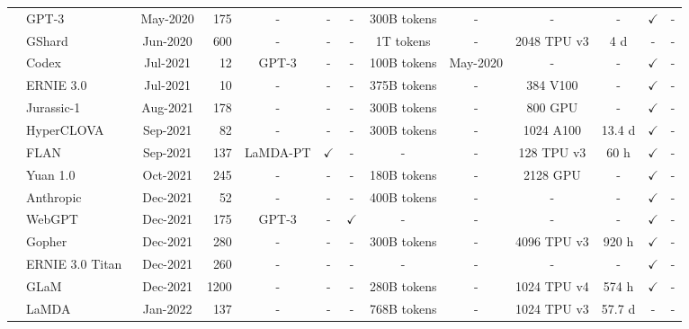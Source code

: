 \begin{table}[htbp]
\begin{tabular}{llcrccccccccc}
\midrule
\midrule
  & GPT-3~\cite{Brown-NeurIPS-2020-Language}    & May-2020    & 175   & -   & - & - & {300B tokens} & -  & -   & -  & $\checkmark$ & -       \\
  & GShard~\cite{Lepikhin-ILR-2021-GShard}   & Jun-2020    & 600   & -   & - & - & 1T tokens & -  & 2048 TPU v3 & 4 d & -    & -       \\
  & Codex~\cite{Chen-arxiv-2021-evaluating}    & Jul-2021    & 12    & GPT-3   & - & - & 100B tokens & May-2020 & -   & -  & $\checkmark$    & - \\
  & ERNIE 3.0~\cite{Sun-arXiv-2021-ERNIE3.0}    & Jul-2021    & 10    & -   & - & - & 375B tokens & - & 384 V100   & -  & $\checkmark$ & -    \\
  & Jurassic-1~\cite{lieber-2021-jurassic}   & Aug-2021    & 178   & -   & - & - & 300B tokens   & -  & 800 GPU & -  & $\checkmark$    & -       \\
  & HyperCLOVA~\cite{Kim-EMNLP-2021-HyperCLOVA}   & Sep-2021    & 82    & - & -  & - &  300B tokens  & - & 1024 A100   & 13.4 d  & $\checkmark$ & -      \\
  & FLAN~\cite{Wei-ICLR-2022-Finetuned} & Sep-2021    & 137   & LaMDA-PT   & $\checkmark$  & - & -  & -  & 128 TPU v3  & 60 h   & $\checkmark$  & -    \\
  & Yuan 1.0~\cite{Wu-arxiv-2021-Yuan}   & Oct-2021    & 245    &  - & -  & - &  180B tokens  &  -  & 2128 GPU  &  -  & $\checkmark$ & - \\
  & Anthropic~\cite{Askell-arxiv-2021-Anthropic}   & Dec-2021    & 52   & -   & - & - & {400B tokens}   & - & -   & -  & $\checkmark$    & -        \\
  & WebGPT~\cite{Nakano-arxiv-2021-WebGPT}   & Dec-2021    & 175   & GPT-3   & - & $\checkmark$  & - & -  & -   & -  & $\checkmark$ &  -    \\
  & Gopher~\cite{Rae-arxiv-2021-Scaling}   & Dec-2021    & 280   & -   & - & - & 300B tokens   & -  & 4096 TPU v3 & 920 h  & $\checkmark$    & -        \\
  & ERNIE 3.0 Titan~\cite{Wang-arxiv-2021-ERNIE}   & Dec-2021    & 260    &  - & -  & - &  -  & - & -  & -  & $\checkmark$ & -  \\
  & GLaM~\cite{Du-ICML-2022-GLaM} & Dec-2021    & 1200  & -   & - & - & 280B tokens   & -  & 1024 TPU v4 & 574 h  & $\checkmark$ & -       \\
  & LaMDA~\cite{Thoppilan-CoRR-2022-LaMDA}    & Jan-2022    & 137   & -   & - & - & 768B tokens  & -  & 1024 TPU v3 & 57.7 d & -    & -       \\

\end{tabular}
\end{table}
